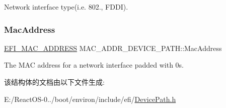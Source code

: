 Network interface type(i.\+e. 802., F\+D\+DI). \mbox{\label{struct_m_a_c___a_d_d_r___d_e_v_i_c_e___p_a_t_h_a6d73c7e77507b491059deafaed8522b6}} 
\subsubsection{\texorpdfstring{Mac\+Address}{MacAddress}}
{\footnotesize\ttfamily \hyperlink{struct_e_f_i___m_a_c___a_d_d_r_e_s_s}{E\+F\+I\+\_\+\+M\+A\+C\+\_\+\+A\+D\+D\+R\+E\+SS} M\+A\+C\+\_\+\+A\+D\+D\+R\+\_\+\+D\+E\+V\+I\+C\+E\+\_\+\+P\+A\+T\+H\+::\+Mac\+Address}

The M\+AC address for a network interface padded with 0s. 

该结构体的文档由以下文件生成\+:\begin{DoxyCompactItemize}
\item 
E\+:/\+React\+O\+S-\/0../boot/environ/include/efi/\hyperlink{_device_path_8h}{Device\+Path.\+h}\end{DoxyCompactItemize}

